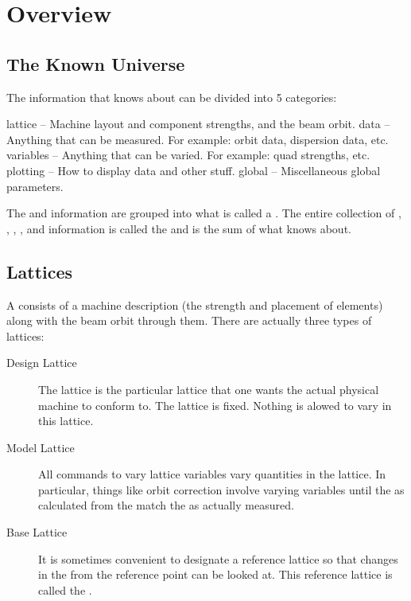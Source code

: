 \chapter{Overview}
\label{c:overview}

\section{The Known Universe}

The information that \tao knows about can be divided into 5 categories: 
\begin{example}
  lattice   -- Machine layout and component strengths, and the beam orbit.
  data      -- Anything that can be measured. For example: orbit data, dispersion data, etc.
  variables -- Anything that can be varied. For example: quad strengths, etc.
  plotting  -- How to display data and other stuff.
  global    -- Miscellaneous global parameters.
\end{example}
The  and  information are grouped into what is called a
. The entire collection of , ,
, , and  information is called
the  and is the sum of what \tao knows about.

\section{Lattices}

A  consists of a machine description (the strength and placement of elements)
along with the beam orbit through them. There are actually three types of lattices:
  \vspace*{-3ex}
  \begin{description}
  \item[Design Lattice] \Newline 
The  lattice is the particular lattice that one wants the
actual physical machine to conform to. The  lattice is fixed. Nothing is
alowed to vary in this lattice.
  \item[Model Lattice] \Newline
All \tao commands to vary lattice variables vary quantities in the
 lattice. In particular, things like orbit correction
involve varying  variables until the  as calculated
from the  match the  as actually measured.
  \item[Base Lattice] \Newline
It is sometimes convenient to designate a reference lattice so that
changes in the  from the reference point can be looked at.
This reference lattice is called the .
  \end{description}


